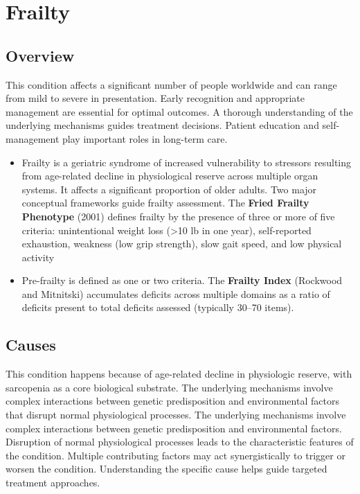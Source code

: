 \chapter{Frailty}
\label{sec:Frailty}

\section{Overview}
This condition affects a significant number of people worldwide and can range from mild to severe in presentation. Early recognition and appropriate management are essential for optimal outcomes. A thorough understanding of the underlying mechanisms guides treatment decisions. Patient education and self-management play important roles in long-term care.

\begin{itemize}[noitemsep]
  \item Frailty is a geriatric syndrome of increased vulnerability to stressors resulting from age-related decline in physiological reserve across multiple organ systems. It affects a significant proportion of older adults. Two major conceptual frameworks guide frailty assessment. The \textbf{Fried Frailty Phenotype} (2001) defines frailty by the presence of three or more of five criteria: unintentional weight loss (>10 lb in one year), self-reported exhaustion, weakness (low grip strength), slow gait speed, and low physical activity
  \item Pre-frailty is defined as one or two criteria. The \textbf{Frailty Index} (Rockwood and Mitnitski) accumulates deficits across multiple domains as a ratio of deficits present to total deficits assessed (typically 30--70 items).
\end{itemize}
\section{Causes}
This condition happens because of age-related decline in physiologic reserve, with sarcopenia as a core biological substrate. The underlying mechanisms involve complex interactions between genetic predisposition and environmental factors that disrupt normal physiological processes. The underlying mechanisms involve complex interactions between genetic predisposition and environmental factors. Disruption of normal physiological processes leads to the characteristic features of the condition. Multiple contributing factors may act synergistically to trigger or worsen the condition. Understanding the specific cause helps guide targeted treatment approaches.
